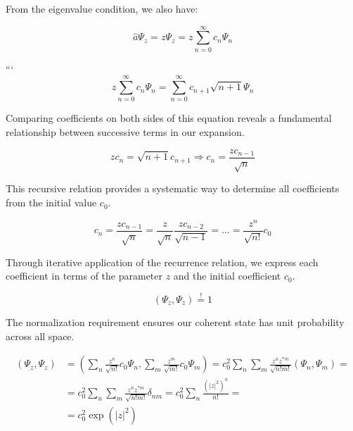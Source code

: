 \documentclass[10pt]{article}
\begin{document}
From the eigenvalue condition, we also have:

\begin{equation*}
\hat{a} \Psi_{z}=z \Psi_{z}=z \sum_{n=0}^{\infty} c_{n} \Psi_{n} \tag{7.81}
\end{equation*}

```
\begin{equation*}
z \sum_{n=0}^{\infty} c_{n} \Psi_{n}=\sum_{n=0}^{\infty} c_{n+1} \sqrt{n+1} \Psi_{n} \tag{7.82}
\end{equation*}

Comparing coefficients on both sides of this equation reveals a fundamental relationship between successive terms in our expansion.

\begin{equation*}
z c_{n}=\sqrt{n+1} c_{n+1} \Longrightarrow c_{n}=\frac{z c_{n-1}}{\sqrt{n}} \tag{7.83}
\end{equation*}

This recursive relation provides a systematic way to determine all coefficients from the initial value $c_0$.

\begin{equation*}
c_{n}=\frac{z c_{n-1}}{\sqrt{n}}=\frac{z}{\sqrt{n}} \frac{z c_{n-2}}{\sqrt{n-1}}=\ldots=\frac{z^{n}}{\sqrt{n!}} c_{0} \tag{7.84}
\end{equation*}

Through iterative application of the recurrence relation, we express each coefficient in terms of the parameter $z$ and the initial coefficient $c_0$.

\begin{equation*}
\left(\Psi_{z}, \Psi_{z}\right) \stackrel{!}{=} 1 \tag{7.85}
\end{equation*}

The normalization requirement ensures our coherent state has unit probability across all space.

\begin{align*}
\left(\Psi_{z}, \Psi_{z}\right) & =\left(\sum_{n} \frac{z^{n}}{\sqrt{n!}} c_{0} \Psi_{n}, \sum_{m} \frac{z^{m}}{\sqrt{m!}} c_{0} \Psi_{m}\right)=c_{0}^{2} \sum_{n} \sum_{m} \frac{z^{n} z^{* m}}{\sqrt{n!m!}}\left(\Psi_{n}, \Psi_{m}\right)= \\
& =c_{0}^{2} \sum_{n} \sum_{m} \frac{z^{n} z^{* m}}{\sqrt{n!m!}} \delta_{n m}=c_{0}^{2} \sum_{n} \frac{\left(|z|^{2}\right)^{n}}{n!}= \\
& =c_{0}^{2} \exp \left(|z|^{2}\right) \tag{7.86}
\end{align*}
\end{document}
